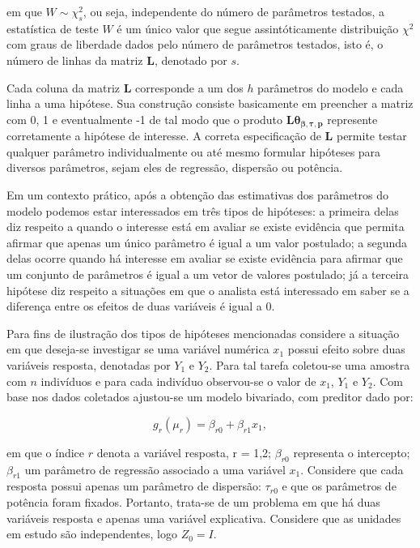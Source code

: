\noindent em que $W \sim \chi^2_s$, ou seja, independente do número de parâmetros testados, a estatística de teste $W$ é um único valor que segue assintóticamente distribuição $\chi^2$ com graus de liberdade dados pelo número de parâmetros testados, isto é, o número de linhas da matriz $\boldsymbol{L}$, denotado por $s$. 

Cada coluna da matriz $\boldsymbol{L}$ corresponde a um dos $h$ parâmetros do modelo e cada linha a uma hipótese. Sua construção consiste basicamente em preencher a matriz com 0, 1 e eventualmente -1 de tal modo que o produto $\boldsymbol{L}\boldsymbol{\theta_{\beta,\tau,p}}$ represente corretamente a hipótese de interesse. A correta especificação de $\boldsymbol{L}$ permite testar qualquer parâmetro individualmente ou até mesmo formular hipóteses para diversos parâmetros, sejam eles de regressão, dispersão ou potência. 

Em um contexto prático, após a obtenção das estimativas dos parâmetros do modelo podemos estar interessados em três tipos de hipóteses: a primeira delas diz respeito a quando o interesse está em avaliar se existe evidência que permita afirmar que apenas um único parâmetro é igual a um valor postulado; a segunda delas ocorre quando há interesse em avaliar se existe evidência para afirmar que um conjunto de parâmetros é igual a um vetor de valores postulado; já a terceira hipótese diz respeito a situações em que o analista está interessado em saber se a diferença entre os efeitos de duas variáveis é igual a 0.

Para fins de ilustração dos tipos de hipóteses mencionadas considere a situação em que deseja-se investigar se uma variável numérica $x_1$ possui efeito sobre duas variáveis resposta, denotadas por $Y_1$ e $Y_2$. Para tal tarefa coletou-se uma amostra com $n$ indivíduos e para cada indivíduo observou-se o valor de $x_1$, $Y_1$ e $Y_2$. Com base nos dados coletados ajustou-se um modelo bivariado, com preditor dado por:

\begin{equation}
\label{eq:pred_ex}
g_r(\mu_r) = \beta_{r0} + \beta_{r1} x_1,
\end{equation}

\noindent em que o índice $r$ denota a variável resposta, r = 1,2; $\beta_{r0}$ representa o intercepto; $\beta_{r1}$ um parâmetro de regressão associado a uma variável $x_1$. Considere que cada resposta possui apenas um parâmetro de dispersão: $\tau_{r0}$ e que os parâmetros de potência foram fixados. Portanto, trata-se de um problema em que há duas variáveis resposta e apenas uma variável explicativa. Considere que as unidades em estudo são independentes, logo $Z_0 = I$. 

